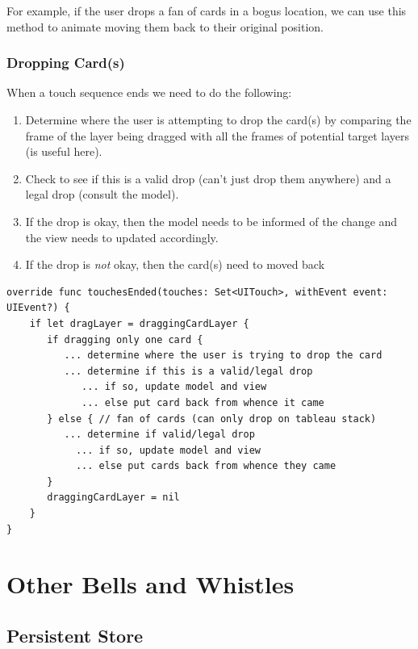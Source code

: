 \documentclass[11pt]{article}
\begin{document}
For example, if the user drops a fan of cards in a bogus location, we can
use this method to animate moving them back to their original position.

\subsubsection{Dropping Card(s)}

When a touch sequence ends we need to do the following:
\begin{enumerate}
\item Determine where the user is attempting to drop
  the card(s) by comparing the frame of
  the layer being dragged with all the frames of potential target layers
  (\verb@CGRectIntersectsRect@ is useful here).
\item Check to see if this is a valid drop (can't just drop them anywhere) 
  and a legal drop (consult the model).
\item If the drop is okay, then the model needs to be informed of the change
  and the view needs to updated accordingly.
\item If the drop is {\em not} okay, then the card(s) need to moved back
\end{enumerate}
\begin{verbatim}
override func touchesEnded(touches: Set<UITouch>, withEvent event: UIEvent?) {
    if let dragLayer = draggingCardLayer {
       if dragging only one card {
          ... determine where the user is trying to drop the card
          ... determine if this is a valid/legal drop
             ... if so, update model and view
             ... else put card back from whence it came
       } else { // fan of cards (can only drop on tableau stack)
          ... determine if valid/legal drop
            ... if so, update model and view
            ... else put cards back from whence they came
       }
       draggingCardLayer = nil
    }
}
\end{verbatim}

\section{Other Bells and Whistles} \label{sec:bells-and-whistles}

\subsection{Persistent Store}
\end{document}

